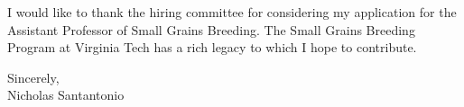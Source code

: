 \documentclass[11pt, letterpaper]{moderncv}
\begin{document}
I would like to thank the hiring committee for considering my application for the Assistant Professor of Small Grains Breeding. The Small Grains Breeding Program at Virginia Tech has a rich legacy to which I hope to contribute. 

\vspace{3mm}

Sincerely,\\
\vspace{2cm}
Nicholas Santantonio
\end{document}
